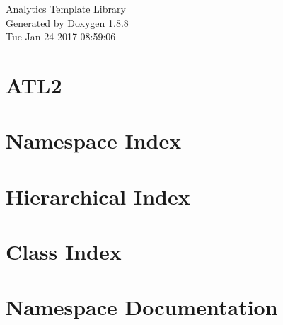 \documentclass[twoside]{book}
\newcommand{\+}{\discretionary{\mbox{\scriptsize$\hookleftarrow$}}{}{}}
\newcommand{\clearemptydoublepage}{%
  \newpage{\pagestyle{empty}\cleardoublepage}%
}
\begin{document}
\hypersetup{pageanchor=false,
             bookmarks=true,
             bookmarksnumbered=true,
             pdfencoding=unicode
            }
\begin{titlepage}
\vspace*{7cm}
\begin{center}%
{\Large Analytics Template Library }\\
\vspace*{1cm}
{\large Generated by Doxygen 1.8.8}\\
\vspace*{0.5cm}
{\small Tue Jan 24 2017 08:59:06}\\
\end{center}
\end{titlepage}
\clearemptydoublepage
\tableofcontents
\clearemptydoublepage
{}
\hypersetup{pageanchor=true}

\chapter{A\+T\+L2}
\label{md__a_t_l2__r_e_a_d_m_e}
\hypertarget{md__a_t_l2__r_e_a_d_m_e}{}

\chapter{Namespace Index}

\chapter{Hierarchical Index}

\chapter{Class Index}

\chapter{Namespace Documentation}




\end{document}
